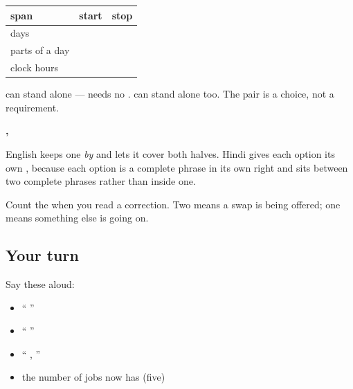 \begin{grammarlens}[title={Grammar Lens: the partner, and where it stands}]
\noindent
\begin{tabularx}{\linewidth}{@{}>{\raggedright\arraybackslash}X>{\raggedright\arraybackslash}X>{\raggedright\arraybackslash}X@{}}
\toprule
\textbf{span} & \textbf{start} & \textbf{stop} \\
\midrule
days & \hi{सोमवार} \hi{से} & \hi{शुक्रवार} \hi{तक} \\
parts of a day & \hi{सुबह} \hi{से} & \hi{शाम} \hi{तक} \\
clock hours & \hi{दस} \hi{बजे} \hi{से} & \hi{पाँच} \hi{बजे} \hi{तक} \\
\bottomrule
\end{tabularx}

\textbf{} can stand alone — \textbf{  } needs no \textbf{}. \textbf{} can stand alone too. The pair is a choice, not a requirement.
\end{grammarlens}

\begin{grammarlens}[title={Grammar Lens: the one place two \hi{से} are compulsory}]
\textbf{  ,  }

English keeps one \emph{by} and lets it cover both halves. Hindi gives each option its own \textbf{}, because each option is a complete phrase in its own right and \textbf{} sits between two complete phrases rather than inside one.

Count the \textbf{} when you read a correction. Two means a swap is being offered; one means something else is going on.
\end{grammarlens}

\subsection*{Your turn}
Say these aloud:

\begin{itemize}
\raggedright
  \item \textquotedblleft{}   \textquotedblright{}
  \item \textquotedblleft{}   \textquotedblright{}
  \item \textquotedblleft{}  ,  \textquotedblright{}
  \item the number of jobs \textbf{} now has (five)
\end{itemize}


